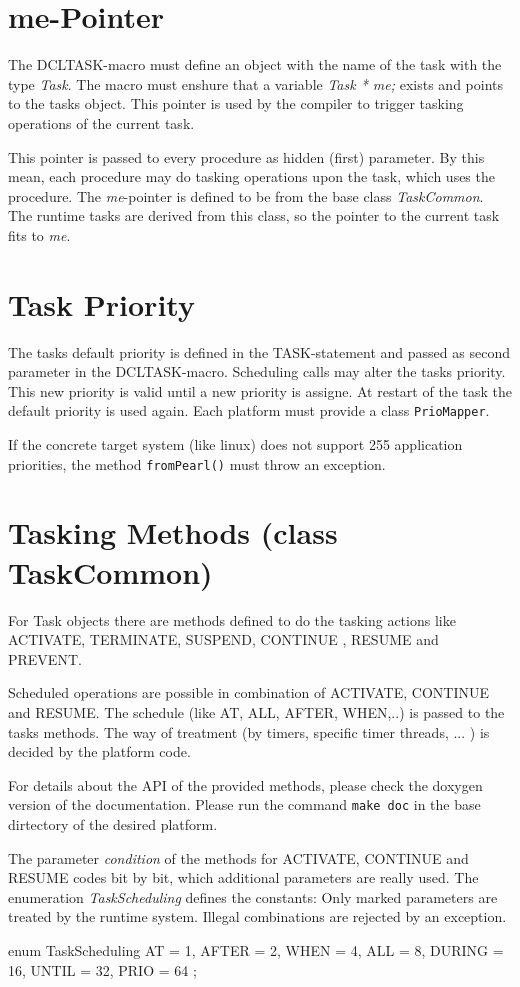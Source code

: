 \section{me-Pointer}
The DCLTASK-macro must define an object with the name of the
task with the type {\em Task}.
The macro must enshure that a variable  {\em Task * me;} exists
and points to the tasks object. This pointer is used
by the compiler to trigger tasking operations of the current
task.

This pointer is passed to every procedure as hidden (first) parameter.
By this mean, each procedure may do tasking operations upon the
task, which uses the procedure.
The {\em me}-pointer is defined to be from the base class  {\em TaskCommon}. 
The runtime tasks are derived from this class, so the pointer to the current 
task fits to {\em me}.

\section{Task Priority}
The tasks default priority is defined in the TASK-statement and passed
as second parameter in the DCLTASK-macro.
Scheduling calls may alter the tasks priority. This new priority is valid 
until a new priority is assigne. At restart of the task the default 
priority is used again. Each platform must provide a class \verb|PrioMapper|.

If the concrete target system (like linux) does not support 255 
 application priorities, the method \verb|fromPearl()| must throw
an exception.

\section{Tasking Methods (class TaskCommon)}
For Task objects there are methods defined to do the tasking actions like
ACTIVATE, TERMINATE, SUSPEND, CONTINUE , RESUME and PREVENT.

Scheduled operations are possible in combination of ACTIVATE, 
CONTINUE and RESUME.
The schedule (like AT, ALL, AFTER, WHEN,..) is passed to the 
tasks methods. The way of treatment (by timers, specific timer threads, ... )
is decided by the platform code.

For details about the API of the provided methods, please check the doxygen 
version of the documentation.
Please run  the command \verb|make doc| in the base dirtectory of the
desired platform.

The parameter {\em condition} of the methods for ACTIVATE, CONTINUE and RESUME
codes bit by bit, which additional parameters are really used.
The enumeration {\em TaskScheduling} defines the constants:
Only marked parameters are treated by the runtime system.
Illegal combinations are rejected by an exception.
\begin{CppCode}
      enum TaskScheduling {
         AT = 1, AFTER = 2, WHEN = 4, ALL = 8,
         DURING = 16, UNTIL = 32, PRIO = 64
      };
\end{CppCode}

